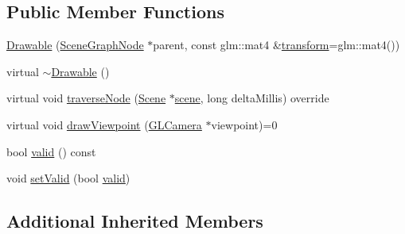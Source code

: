 \subsection*{Public Member Functions}
\begin{DoxyCompactItemize}
\item 
\hyperlink{classmotorcar_1_1Drawable_a48451c25ab7c1e379afec893f4c3d6f3}{Drawable} (\hyperlink{classmotorcar_1_1SceneGraphNode}{Scene\-Graph\-Node} $\ast$parent, const glm\-::mat4 \&\hyperlink{classmotorcar_1_1SceneGraphNode_ad96e79fdd739ac8223a3128003be391a}{transform}=glm\-::mat4())
\item 
virtual \hyperlink{classmotorcar_1_1Drawable_ab638464364b93a00bdeacc64cc85ba41}{$\sim$\-Drawable} ()
\item 
virtual void \hyperlink{classmotorcar_1_1Drawable_a931cb72d30d280d0e63f22c2e1ac39c6}{traverse\-Node} (\hyperlink{classmotorcar_1_1Scene}{Scene} $\ast$\hyperlink{classmotorcar_1_1SceneGraphNode_aa14e637ed4ae98f77e28941a4b5cfdd8}{scene}, long delta\-Millis) override
\item 
virtual void \hyperlink{classmotorcar_1_1Drawable_aa991a852cb0421ecef23669df01b5b62}{draw\-Viewpoint} (\hyperlink{classmotorcar_1_1GLCamera}{G\-L\-Camera} $\ast$viewpoint)=0
\item 
bool \hyperlink{classmotorcar_1_1Drawable_ae7222a86680cf622f5bcf3be09027e59}{valid} () const 
\item 
void \hyperlink{classmotorcar_1_1Drawable_abc7eb95fa89843f57c4d93bad3e2c4db}{set\-Valid} (bool \hyperlink{classmotorcar_1_1Drawable_ae7222a86680cf622f5bcf3be09027e59}{valid})
\end{DoxyCompactItemize}
\subsection*{Additional Inherited Members}


